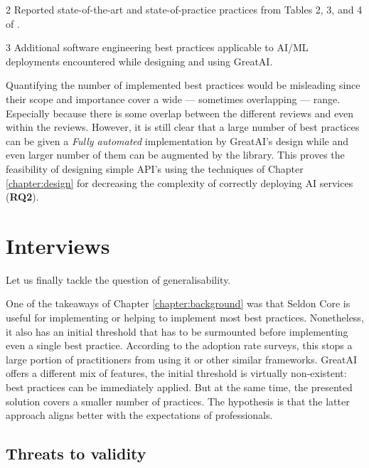 \begin{table}
\begin{threeparttable}
{\begin{tabular}{p{7cm}@{\hskip 0.5cm}l@{\hskip 0cm}c}
\end{tabular}}
\begin{tablenotes}
    \item[2] Reported state-of-the-art and state-of-practice practices from Tables 2, 3, and 4 of \cite{john2020architecting}.
    \item[3] Additional software engineering best practices applicable to AI/ML deployments encountered while designing and using GreatAI.
    \end{tablenotes}
\end{threeparttable}
\end{table}

Quantifying the number of implemented best practices would be misleading since their scope and importance cover a wide --- sometimes overlapping --- range. Especially because there is some overlap between the different reviews and even within the reviews. However, it is still clear that a large number of best practices can be given a \textit{Fully automated} implementation by GreatAI's design while and even larger number of them can be augmented by the library. This proves the feasibility of designing simple API's using the techniques of Chapter \ref{chapter:design} for decreasing the complexity of correctly deploying AI services (\textbf{RQ2}).

\section{Interviews} \label{section:interviews}

Let us finally tackle the question of generalisability.

One of the takeaways of Chapter \ref{chapter:background} was that Seldon Core is useful for implementing or helping to implement most best practices. Nonetheless, it also has an initial threshold that has to be surmounted before implementing even a single best practice. According to the adoption rate surveys, this stops a large portion of practitioners from using it or other similar frameworks. GreatAI offers a different mix of features, the initial threshold is virtually non-existent: best practices can be immediately applied. But at the same time, the presented solution covers a smaller number of practices. The hypothesis is that the latter approach aligns better with the expectations of professionals. 

\subsection{Threats to validity}

